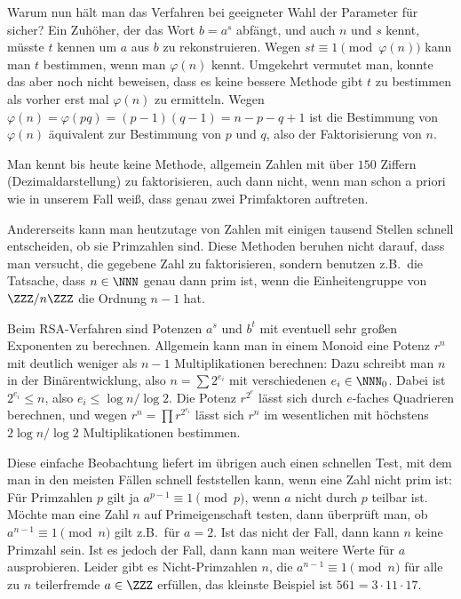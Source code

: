 \documentclass[12pt,a4paper,twoside]{article}
\begin{document}
Warum nun h\"alt man das Verfahren bei geeigneter Wahl der Parameter f\"ur
sicher? Ein Zuh\"oher, der das Wort $b=a^s$ abf\"angt, und auch $n$ und $s$
kennt, m\"usste $t$ kennen um $a$ aus $b$ zu rekonstruieren. Wegen
$st\equiv1\pmod{\varphi(n)}$ kann man $t$ bestimmen, wenn man $\varphi(n)$
kennt. Umgekehrt vermutet man, konnte das aber noch nicht beweisen, dass es
keine bessere Methode gibt $t$ zu bestimmen als vorher erst mal $\varphi(n)$
zu ermitteln. Wegen $\varphi(n)=\varphi(pq)=(p-1)(q-1)=n-p-q+1$ ist die
Bestimmung von $\varphi(n)$ \"aquivalent zur Bestimmung von $p$ und $q$, also
der Faktorisierung von $n$.

Man kennt bis heute keine Methode, allgemein Zahlen mit \"uber $150$ Ziffern
(Dezimaldarstellung) zu faktorisieren, auch dann nicht, wenn man schon a
priori wie in unserem Fall wei\ss, dass genau zwei Primfaktoren auftreten.

Andererseits kann man heutzutage von Zahlen mit einigen tausend Stellen
schnell entscheiden, ob sie Primzahlen sind. Diese Methoden beruhen nicht
darauf, dass man versucht, die gegebene Zahl zu faktorisieren, sondern
benutzen z.B.\ die Tatsache, dass $n\in\NNN$ genau dann prim ist, wenn die
Einheitengruppe von $\ZZZ/n\ZZZ$ die Ordnung $n-1$ hat.

Beim RSA-Verfahren sind Potenzen $a^s$ und $b^t$ mit eventuell sehr gro\ss en
Exponenten zu berechnen. Allgemein kann man in einem Monoid eine Potenz $r^n$
mit deutlich weniger als $n-1$ Multiplikationen berechnen: Dazu schreibt man
$n$ in der Bin\"arentwicklung, also $n=\sum 2^{e_i}$ mit verschiedenen
$e_i\in\NNN_0$. Dabei ist $2^{e_i}\le n$, also $e_i\le\log n/\log 2$. Die
Potenz $r^{2^e}$ l\"asst sich durch $e$-faches Quadrieren berechnen, und wegen
$r^n=\prod r^{2^{e_i}}$ l\"asst sich $r^n$ im wesentlichen mit h\"ochstens
$2\log n/\log 2$ Multiplikationen bestimmen.

Diese einfache Beobachtung liefert im \"ubrigen auch einen schnellen Test, mit
dem man in den meisten F\"allen schnell feststellen kann, wenn eine Zahl nicht
prim ist: F\"ur Primzahlen $p$ gilt ja $a^{p-1}\equiv 1\pmod{p}$, wenn $a$
nicht durch $p$ teilbar ist. M\"ochte man eine Zahl $n$ auf Primeigenschaft
testen, dann \"uberpr\"uft man, ob $a^{n-1}\equiv 1\pmod{n}$ gilt z.B.\ f\"ur
$a=2$. Ist das nicht der Fall, dann kann $n$ keine Primzahl sein. Ist es
jedoch der Fall, dann kann man weitere Werte f\"ur $a$ ausprobieren. Leider
gibt es Nicht-Primzahlen $n$, die $a^{n-1}\equiv 1\pmod{n}$ f\"ur alle zu $n$
teilerfremde $a\in\ZZZ$ erf\"ullen, das kleinste Beispiel ist $561=3\cdot
11\cdot 17$.
\end{document}

